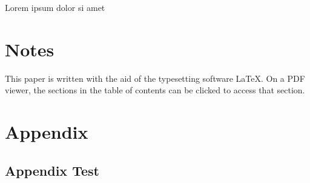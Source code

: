 \documentclass[11pt,letterpaper]{article}
\begin{document}
Lorem ipsum dolor si amet

\newpage
{}


\section*{Notes}
\label{sec:notes}

This paper is written with the aid of the typesetting software \LaTeX. On a PDF viewer, the sections in the table of contents can be clicked to access that section.

\printbibliography

\appendix
\section{Appendix}
\label{app}

\subsection{Appendix Test}
\label{app:test}
\end{document}
